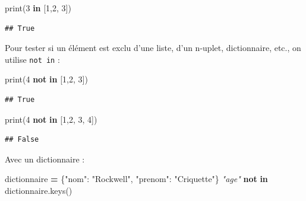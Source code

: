 \documentclass[12pt,]{book}
\newenvironment{Shaded}{\begin{snugshade}}{\end{snugshade}}
\newcommand{\KeywordTok}[1]{\textcolor[rgb]{0.13,0.29,0.53}{\textbf{#1}}}
\newcommand{\DecValTok}[1]{\textcolor[rgb]{0.00,0.00,0.81}{#1}}
\newcommand{\StringTok}[1]{\textcolor[rgb]{0.31,0.60,0.02}{#1}}
\newcommand{\CommentTok}[1]{\textcolor[rgb]{0.56,0.35,0.01}{\textit{#1}}}
\newcommand{\OperatorTok}[1]{\textcolor[rgb]{0.81,0.36,0.00}{\textbf{#1}}}
\newcommand{\BuiltInTok}[1]{#1}
\newcommand{\NormalTok}[1]{#1}
\numberwithin{equation}{section}
\numberwithin{countremarque}{section}
\begin{document}
\begin{Shaded}
\begin{Highlighting}[]
\BuiltInTok{print}\NormalTok{(}\DecValTok{3} \KeywordTok{in}\NormalTok{ [}\DecValTok{1}\NormalTok{,}\DecValTok{2}\NormalTok{, }\DecValTok{3}\NormalTok{])}
\end{Highlighting}
\end{Shaded}

\begin{lstlisting}
## True
\end{lstlisting}

Pour tester si un élément est exclu d'une liste, d'un n-uplet,
dictionnaire, etc., on utilise \texttt{not\ in} :

\begin{Shaded}
\begin{Highlighting}[]
\BuiltInTok{print}\NormalTok{(}\DecValTok{4} \KeywordTok{not} \KeywordTok{in}\NormalTok{ [}\DecValTok{1}\NormalTok{,}\DecValTok{2}\NormalTok{, }\DecValTok{3}\NormalTok{])}
\end{Highlighting}
\end{Shaded}

\begin{lstlisting}
## True
\end{lstlisting}

\begin{Shaded}
\begin{Highlighting}[]
\BuiltInTok{print}\NormalTok{(}\DecValTok{4} \KeywordTok{not} \KeywordTok{in}\NormalTok{ [}\DecValTok{1}\NormalTok{,}\DecValTok{2}\NormalTok{, }\DecValTok{3}\NormalTok{, }\DecValTok{4}\NormalTok{])}
\end{Highlighting}
\end{Shaded}

\begin{lstlisting}
## False
\end{lstlisting}

Avec un dictionnaire :

\begin{Shaded}
\begin{Highlighting}[]
\NormalTok{dictionnaire }\OperatorTok{=}\NormalTok{ \{}\StringTok{"nom"}\NormalTok{: }\StringTok{"Rockwell"}\NormalTok{, }\StringTok{"prenom"}\NormalTok{: }\StringTok{"Criquette"}\NormalTok{\}}
\CommentTok{"age"} \KeywordTok{not} \KeywordTok{in}\NormalTok{ dictionnaire.keys()}
\end{Highlighting}
\end{Shaded}
\end{document}
